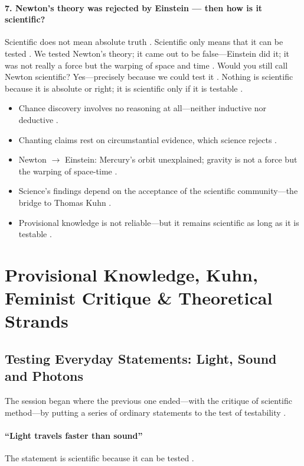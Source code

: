 \paragraph{7. Newton's theory was rejected by Einstein --- then how is it scientific?}
Scientific does not mean absolute truth . Scientific only means that it can be tested . We tested Newton's theory; it came out to be false---Einstein did it; it was not really a force but the warping of space and time . Would you still call Newton scientific? Yes---precisely because we could test it . Nothing is scientific because it is absolute or right; it is scientific only if it is testable .

\begin{QuickRevision}
\begin{itemize}
    \item Chance discovery involves no reasoning at all---neither inductive nor deductive .
    \item Chanting claims rest on circumstantial evidence, which science rejects .
    \item Newton $\rightarrow$ Einstein: Mercury's orbit unexplained; gravity is not a force but the warping of space-time .
    \item Science's findings depend on the acceptance of the scientific community---the bridge to Thomas Kuhn .
    \item Provisional knowledge is not reliable---but it remains scientific as long as it is testable .
\end{itemize}
\end{QuickRevision}

\sectiondivider

\section{Provisional Knowledge, Kuhn, Feminist Critique \& Theoretical Strands}

\subsection{Testing Everyday Statements: Light, Sound and Photons}
The session began where the previous one ended---with the critique of scientific method---by putting a series of ordinary statements to the test of testability .

\paragraph{``Light travels faster than sound''}
The statement is scientific because it can be tested .


